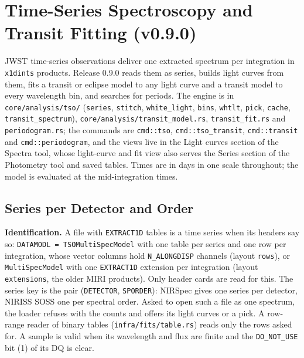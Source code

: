 \documentclass[11pt,a4paper]{article}
\newcommand{\code}[1]{\texttt{\small #1}}
\begin{document}
    \section{Time-Series Spectroscopy and Transit Fitting (v0.9.0)}
    \label{sec:tso}

    JWST time-series observations deliver one extracted spectrum per integration in \code{x1dints} products. Release 0.9.0 reads them as series, builds light curves from them, fits a transit or eclipse model to any light curve and a transit model to every wavelength bin, and searches for periods. The engine is in \code{core/analysis/tso/} (\code{series}, \code{stitch}, \code{white\_light}, \code{bins}, \code{whtlt}, \code{pick}, \code{cache}, \code{transit\_spectrum}), \code{core/analysis/transit\_model.rs}, \code{transit\_fit.rs} and \code{periodogram.rs}; the commands are \code{cmd::tso}, \code{cmd::tso\_transit}, \code{cmd::transit} and \code{cmd::periodogram}, and the views live in the Light curves section of the Spectra tool, whose light-curve and fit view also serves the Series section of the Photometry tool and saved tables. Times are in days in one scale throughout; the model is evaluated at the mid-integration times.

    \subsection{Series per Detector and Order}
    \label{sec:tso_series}

    \textbf{Identification.} A file with \code{EXTRACT1D} tables is a time series when its headers say so: \code{DATAMODL = TSOMultiSpecModel} with one table per series and one row per integration, whose vector columns hold \code{N\_ALONGDISP} channels (layout \code{rows}), or \code{MultiSpecModel} with one \code{EXTRACT1D} extension per integration (layout \code{extensions}, the older MIRI products). Only header cards are read for this. The series key is the pair (\code{DETECTOR}, \code{SPORDER}): NIRSpec gives one series per detector, NIRISS SOSS one per spectral order. Asked to open such a file as one spectrum, the loader refuses with the counts and offers its light curves or a pick. A row-range reader of binary tables (\code{infra/fits/table.rs}) reads only the rows asked for. A sample is valid when its wavelength and flux are finite and the \code{DO\_NOT\_USE} bit (1) of its DQ is clear.
\end{document}
